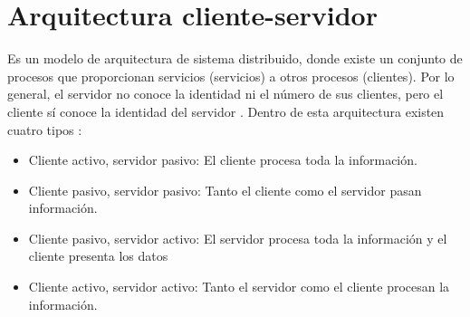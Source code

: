 \section{Arquitectura cliente-servidor} \label{sect:Patrones de arquitectura}

Es un modelo de arquitectura de sistema distribuido, donde existe un conjunto de procesos que proporcionan servicios (servicios) a otros procesos (clientes). Por lo general, el servidor no conoce la identidad ni el número de sus clientes, pero el cliente sí conoce la identidad del servidor \cite{ACS0}. Dentro de esta arquitectura existen cuatro tipos \cite{ACS1}:

\begin{itemize}
\item Cliente activo, servidor pasivo: El cliente procesa toda la información.
\item Cliente pasivo, servidor pasivo: Tanto el cliente como el servidor pasan información.
\item Cliente pasivo, servidor activo: El servidor procesa toda la información y el cliente presenta los datos
\item Cliente activo, servidor activo: Tanto el servidor como el cliente procesan la información.
\end{itemize}